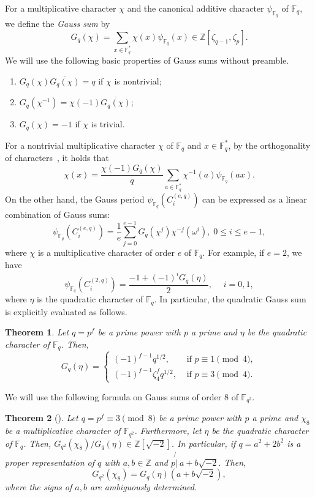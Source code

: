 \documentclass[10pt]{amsart}
\newtheorem{theo}{Theorem}[section]
\theoremstyle{definition}
\newcommand*\Z{{\mathbb Z}}
\newcommand*\F{{\mathbb F}}
\newcommand*{\romanenumi}{\renewcommand*{\theenumi}{\roman{enumi}}}
\begin{document}
For a multiplicative character $\chi$ and the canonical additive character $\psi_{\F_q}$ of $\F_q$, we define the \emph{Gauss sum} by
\[
G_q(\chi)=\sum_{x\in \F_q^\ast}\chi(x)\psi_{\F_q}(x) \in \Z[\zeta_{q-1},\zeta_p].
\]
We will use the following basic properties of Gauss sums without preamble.
\begin{enumerate}\romanenumi
\item $G_q(\chi)\overline{G_q(\chi)}=q$ if $\chi$ is nontrivial;
\item $G_q(\chi^{-1})=\chi(-1)\overline{G_q(\chi)}$;
\item $G_q(\chi)=-1$ if $\chi$ is trivial.
\end{enumerate}
For a nontrivial multiplicative character $\chi$ of $\F_q$ and $x\in \F_q^\ast$, by the orthogonality of characters~\cite[(5.16), p.~195]{LN97}, it holds that
\begin{equation}\label{eq:oth_g}
\chi(x)=\frac{\chi(-1)G_q(\chi)}{q}\sum_{a\in \F_q^\ast}\chi^{-1}(a)\psi_{\F_q}(ax).
\end{equation}
On the other hand, the Gauss period $\psi_{\F_q}(C_i^{(e,q)})$ can be expressed as a linear combination of Gauss sums:
\begin{equation}
\psi_{\F_q}(C_i^{(e,q)})=\frac{1}{e}\sum_{j=0}^{e-1}G_q(\chi^{j})\chi^{-j}(\omega^i), \; 0\le i\le e-1,
\end{equation}
where $\chi$ is a multiplicative character of order $e$ of $\F_q$. For example, if $e=2$, we have
\begin{equation}\label{eq:Gaussquad}
\psi_{\F_q}(C_i^{(2,q)})=\frac{-1+(-1)^iG_q(\eta)}{2},\; \quad i=0,1,
\end{equation}
where $\eta$ is the quadratic character of $\F_q$. In particular, the quadratic Gauss sum is explicitly evaluated as follows.

\begin{theo}
\cite[Theorem~5.15]{LN97} \label{thm:Gauss}
Let $q=p^f$ be a prime power with $p$ a prime and $\eta$ be the quadratic character of $\F_q$. Then,
\[
G_q(\eta)=
\begin{cases}
(-1)^{f-1}q^{1/2},& \text{ if } p\equiv 1\pmod{4}, \\
(-1)^{f-1}\zeta_4^f q^{1/2}, & \text{ if } p\equiv 3\pmod{4}.
\end{cases}
\]
\end{theo}

We will use the following formula on Gauss sums of order $8$ of $\F_{q^2}$.

\begin{theo}[{\cite[Theorem~1.5]{Mv}}] \label{thm:Gauss8}
Let $q=p^f\equiv 3\pmod{8}$ be a prime power with $p$ a prime and $\chi_8$ be a multiplicative character of $\F_{q^2}$. Furthermore, let $\eta$ be the quadratic character of $\F_q$. Then, $G_{q^2}(\chi_8)/G_q(\eta)\in \Z[\sqrt{-2}]$. In particular, if $q=a^2+2b^2$ is a proper representation of $q$ with $a,b\in\Z$ and $p\mathbin{\not{|}\:} a+b\sqrt{-2}$. Then,
\[
G_{q^2}(\chi_8)=G_q(\eta)(a+b\sqrt{-2}),
\]
where the signs of $a,b$ are ambiguously determined.
\end{theo}
\end{document}
